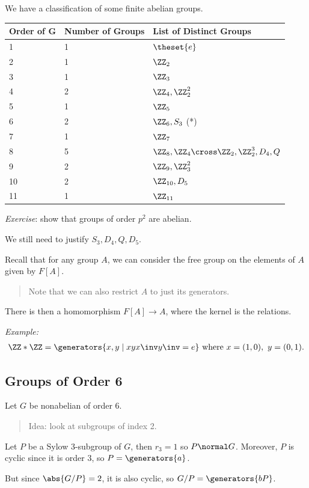 We have a classification of some finite abelian groups.

\begin{longtable}[]{@{}lll@{}}
\toprule
Order of G & Number of Groups & List of Distinct Groups\tabularnewline
\midrule
\endhead
1 & 1 & \(\theset{e}\)\tabularnewline
2 & 1 & \(\ZZ_2\)\tabularnewline
3 & 1 & \(\ZZ_3\)\tabularnewline
4 & 2 & \(\ZZ_4, \ZZ_2^2\)\tabularnewline
5 & 1 & \(\ZZ_5\)\tabularnewline
6 & 2 & \(\ZZ_6, S_3\) (*)\tabularnewline
7 & 1 & \(\ZZ_7\)\tabularnewline
8 & 5 & \(\ZZ_8,\ZZ_4 \cross \ZZ_2, \ZZ_2^3, D_4, Q\)\tabularnewline
9 & 2 & \(\ZZ_9, \ZZ_3^2\)\tabularnewline
10 & 2 & \(\ZZ_{10}, D_5\)\tabularnewline
11 & 1 & \(\ZZ_{11}\)\tabularnewline
\bottomrule
\end{longtable}

\emph{Exercise}: show that groups of order \(p^2\) are abelian.

We still need to justify \(S_3, D_4, Q, D_5\).

Recall that for any group \(A\), we can consider the free group on the
elements of \(A\) given by \(F[A]\).

\begin{quote}
Note that we can also restrict \(A\) to just its generators.
\end{quote}

There is then a homomorphism \(F[A] \to A\), where the kernel is the
relations.

\emph{Example:}
\begin{align*}
\ZZ \ast \ZZ = \generators{x, y \mid xyx\inv y\inv = e} \text{ where } x = (1, 0),~ y = (0, 1)
.\end{align*}

\hypertarget{groups-of-order-6}{%
\subsection{Groups of Order 6}\label{groups-of-order-6}}

Let \(G\) be nonabelian of order \(6\).

\begin{quote}
Idea: look at subgroups of index 2.
\end{quote}

Let \(P\) be a Sylow 3-subgroup of \(G\), then \(r_3 = 1\) so
\(P\normal G\). Moreover, \(P\) is cyclic since it is order 3, so
\(P = \generators{a}\).

But since \(\abs{G/P} = 2\), it is also cyclic, so
\(G/P = \generators{bP}\).


